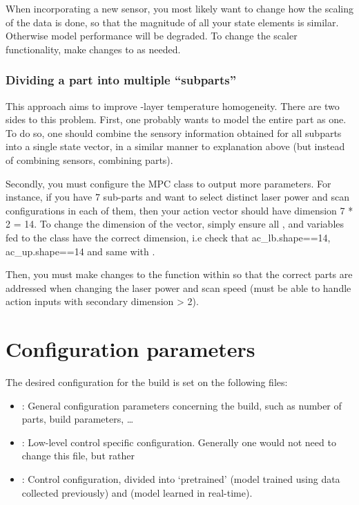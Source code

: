 \documentclass[letterpaper,10pt,english,openany,oneside]{sphinxmanual}
\begin{document}
When incorporating a new sensor, you most likely want to change how the scaling
of the data is done, so that the magnitude of all your state elements is similar.
Otherwise model performance will be degraded. To change the scaler functionality, make changes
to  as needed.


\subsection{Dividing a part into multiple “subparts”}
\label{\detokenize{installation:dividing-a-part-into-multiple-subparts}}
This approach aims to improve -layer temperature homogeneity. There are
two sides to this problem. First, one probably wants to model the entire part as
one. To do so, one should combine the sensory information obtained for all subparts
into a single state vector, in a similar manner to explanation above (but instead
of combining sensors, combining parts).

Secondly, you must configure the MPC class to output more parameters. For instance, if you have
7 sub-parts and want to select distinct laser power and scan configurations in each
of them, then your action vector should have dimension 7 * 2 = 14. To change the dimension of the
vector, simply ensure all ,  and  variables fed to the  class
have the correct dimension, i.e check that ac\_lb.shape==14, ac\_up.shape==14 and same with .

Then, you must make changes to the function  within  so that
the correct parts are addressed when changing the laser power and scan speed (must be able to handle
action inputs with secondary dimension \textgreater{} 2).


\chapter{Configuration parameters}
\label{\detokenize{config:configuration-parameters}}\label{\detokenize{config::doc}}
The desired configuration for the build is set on the following files:
\begin{itemize}
\item {} 
: General configuration parameters concerning the build, such as number of parts, build parameters, …

\item {} 
: Low-level control specific configuration. Generally one would not need to change this file, but rather 

\item {} 
: Control configuration, divided into ‘pretrained’ (model trained using data collected previously) and  (model learned in real-time).

\end{itemize}
\end{document}
